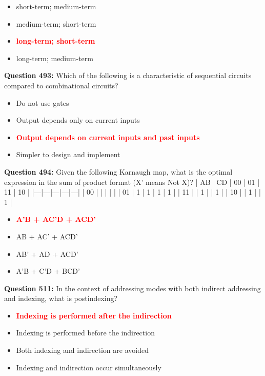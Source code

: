 \documentclass[12pt,a4paper]{article}
\begin{document}
\begin{itemize}
    \item[\textbf{A.}] short-term; medium-term
    \item[\textbf{B.}] medium-term; short-term
    \item[\textbf{C.}] \textcolor{red}{\textbf{long-term; short-term}}
    \item[\textbf{D.}] long-term; medium-term
\end{itemize}

\vspace{0.5cm}

\textbf{Question 493:} Which of the following is a characteristic of sequential circuits compared to combinational circuits?

\begin{itemize}
    \item[\textbf{A.}] Do not use gates
    \item[\textbf{B.}] Output depends only on current inputs
    \item[\textbf{C.}] \textcolor{red}{\textbf{Output depends on current inputs and past inputs}}
    \item[\textbf{D.}] Simpler to design and implement
\end{itemize}

\vspace{0.5cm}

\textbf{Question 494:} Given the following Karnaugh map, what is the optimal expression in the sum of product format (X' means Not X)?
| AB \ CD | 00 | 01 | 11 | 10 |
|---|---|---|---|---|
| 00 | | | | |
| 01 | 1 | 1 | 1 | 1 |
| 11 | | 1 | | 1 |
| 10 | | 1 | | 1 |

\begin{itemize}
    \item[\textbf{A.}] \textcolor{red}{\textbf{A'B + AC'D + ACD'}}
    \item[\textbf{B.}] AB + AC' + ACD'
    \item[\textbf{C.}] AB' + AD + ACD'
    \item[\textbf{D.}] A'B + C'D + BCD'
\end{itemize}

\vspace{0.5cm}

\textbf{Question 511:} In the context of addressing modes with both indirect addressing and indexing, what is postindexing?

\begin{itemize}
    \item[\textbf{A.}] \textcolor{red}{\textbf{Indexing is performed after the indirection}}
    \item[\textbf{B.}] Indexing is performed before the indirection
    \item[\textbf{C.}] Both indexing and indirection are avoided
    \item[\textbf{D.}] Indexing and indirection occur simultaneously
\end{itemize}
\end{document}
